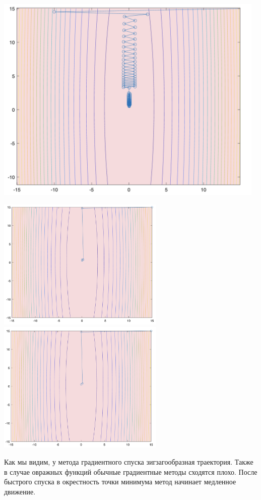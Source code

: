 \documentclass[a4paper,12pt]{article}
\begin{document}
\begin{center}
    \includegraphics[width=130mm]{p12.png}

    \includegraphics[width=80mm]{p22.png}\includegraphics[width=80mm]{p32.png}
\end{center}

Как мы видим, у метода градиентного спуска зигзагообразная траектория. Также в случае овражных функций обычные градиентные методы сходятся плохо. После быстрого спуска в окрестность точки минимума метод начинает медленное движение.
\end{document}
